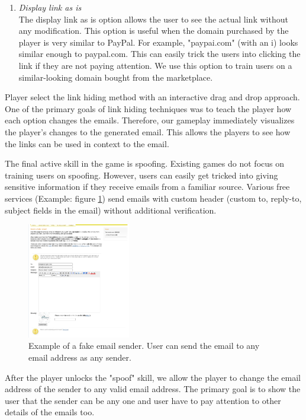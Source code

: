 \begin{enumerate}
    \item \textit{Display link as is}\\
          The display link as is option allows the user to see the actual link without any modification. This option is useful when the domain purchased by the player is very similar to PayPal. For example, "paypai.com" (with an i) looks similar enough to paypal.com. This can easily trick the users into clicking the link if they are not paying attention. We use this option to train users on a similar-looking domain bought from the marketplace.

\end{enumerate}


Player select the link hiding method with an interactive drag and drop approach. One of the primary goals of link hiding techniques was to teach the player how each option changes the emails. Therefore, our gameplay immediately visualizes the player's changes to the generated email. This allows the players to see how the links can be used in context to the email.

The final active skill in the game is spoofing. Existing games do not focus on training users on spoofing. However, users can easily get tricked into giving sensitive information if they receive emails from a familiar source. Various free services (Example: figure \ref{fig:spoof_sender}) send emails with custom header (custom to, reply-to, subject fields in the email) without additional verification.

\begin{figure}[ht]
    \centering
    \includegraphics[width=0.4\textwidth]{figures/section2/spoof_sender.png}
    \caption[Fake email sender]{Example of a fake email sender. User can send the email to any email address as any sender.}
    \label{fig:spoof_sender}
\end{figure}

After the player unlocks the "spoof" skill, we allow the player to change the email address of the sender to any valid email address. The primary goal is to show the user that the sender can be any one and user have to pay attention to other details of the emails too.

